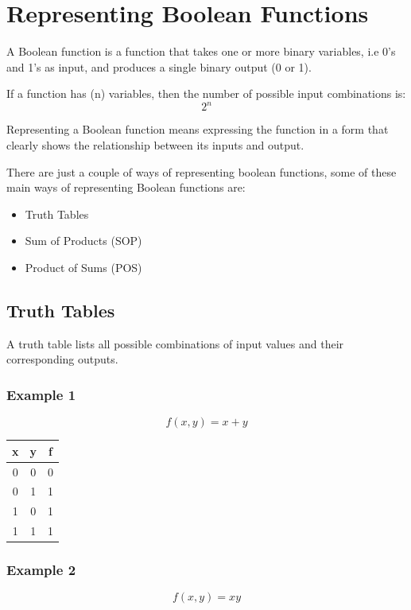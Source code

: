 \section{Representing Boolean Functions}

A Boolean function is a function that takes one or more binary variables, i.e 0's and 1's as input, and produces a single binary output (0 or 1).

If a function has (n) variables, then the number of possible input combinations is:
\[
2^n
\]

Representing a Boolean function means expressing the function in a form that clearly shows the relationship between its inputs and output.

There are just a couple of ways of representing boolean functions, some of these main ways of representing Boolean functions are:
\begin{itemize}
    \item Truth Tables
    \item Sum of Products (SOP)
    \item Product of Sums (POS)
\end{itemize}

\subsection{Truth Tables}

A truth table lists all possible combinations of input values and their corresponding outputs.

\subsubsection*{Example 1}
\[
f(x,y) = x + y
\]

\begin{center}
\begin{tabular}{|c|c|c|}
\hline
x & y & f \\
\hline
0 & 0 & 0 \\
0 & 1 & 1 \\
1 & 0 & 1 \\
1 & 1 & 1 \\
\hline
\end{tabular}
\end{center}

\subsubsection*{Example 2}
\[
f(x,y) = xy
\]


